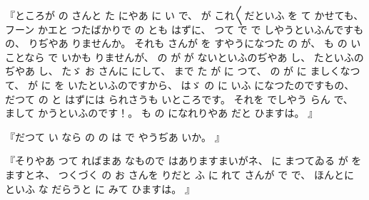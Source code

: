 
%
『ところが
の
さんと
た
にやあ
に
い
で、
%
が
これ〳〵だといふ
を
て
かせても、
%
フーン
かエと
つたばかりで
の
とも
はずに、
%
つて
で
で
しやうといふんですもの、
%
りぢやあ
りませんか。
%
それも
さんが
を
すやうになつた
の
が、
%
も
の
いことなら
で
いかも
りませんが、
%
の
が
が
ないといふのぢやあ
し、
%
たといふのぢやあ
し、
%
たゞ
お
さんに
にして、
%
まで
た
が
に
つて、
%
の
が
に
ましくなつて、
%
が
に
を
いたといふのですから、
%
はゞ
の
に
いふ
になつたのですもの、
%
だつて
の
と
はずには
られさうも
いところです。
%
それを
でしやう
らん
で、
%
まして
かうといふのです！。
%
も
の
になれりやあ
だと
ひますは。
』

%
『だつて
い
なら
の
の
は
で
やうぢあ
いか。
』

%
『そりやあ
つて
ればまあ
なもので
はありますまいがネ、
%
に
まつてゐる
が
を
ますとネ、
%
つくづく
の
お
さんを
りだと
ふ
に
れて
さんが
で%
で、
%
ほんとに%
といふ
な%
だらうと
に
みて
ひますは。
』

